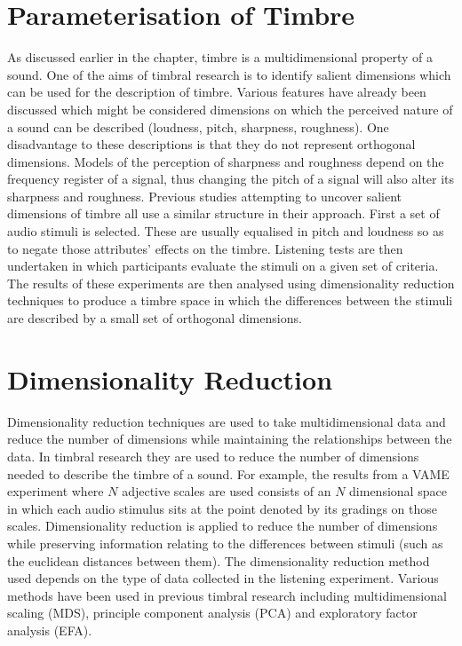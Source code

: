 \section{Parameterisation of Timbre}
\label{sec:Timbre-Parameterisation}
	As discussed earlier in the chapter, timbre is a multidimensional property of a sound. One of the aims of timbral
	research is to identify salient dimensions which can be used for the description of timbre. Various features have
	already been discussed which might be considered dimensions on which the perceived nature of a sound can be
	described (loudness, pitch, sharpness, roughness). One disadvantage to these descriptions is that they do not
	represent orthogonal dimensions. Models of the perception of sharpness and roughness depend on the frequency
	register of a signal, thus changing the pitch of a signal will also alter its sharpness and roughness. Previous
	studies attempting to uncover salient dimensions of timbre all use a similar structure in their approach.  First a
	set of audio stimuli is selected. These are usually equalised in pitch and loudness so as to negate those
	attributes' effects on the timbre. Listening tests are then undertaken in which participants evaluate the stimuli
	on a given set of criteria. The results of these experiments are then analysed using dimensionality reduction
	techniques to produce a timbre space in which the differences between the stimuli are described by a small set of
	orthogonal dimensions.

	\section{Dimensionality Reduction}
	\label{sec:Timbre-Parameterisation-DimensionalityReduction}
		Dimensionality reduction techniques are used to take multidimensional data and reduce the number of
		dimensions while maintaining the relationships between the data. In timbral research they are used to
		reduce the number of dimensions needed to describe the timbre of a sound. For example, the results from a
		VAME experiment where $N$ adjective scales are used consists of an $N$ dimensional space in which each
		audio stimulus sits at the point denoted by its gradings on those scales. Dimensionality reduction is
		applied to reduce the number of dimensions while preserving information relating to the differences between
		stimuli (such as the euclidean distances between them). The dimensionality reduction method used depends on
		the type of data collected in the listening experiment. Various methods have been used in previous timbral
		research including multidimensional scaling (MDS), principle component analysis (PCA) and exploratory
		factor analysis (EFA).


